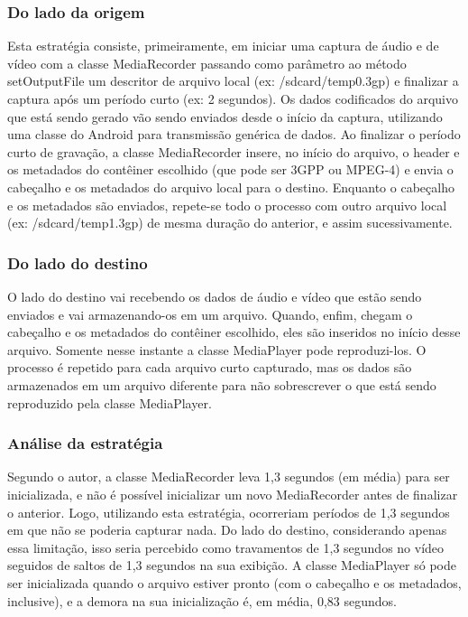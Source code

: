 \documentclass{acm_proc_article-sp}
\begin{document}
\subsubsection{Do lado da origem}

Esta estratégia consiste, primeiramente, em iniciar uma captura de áudio e de vídeo com a classe MediaRecorder passando como parâmetro ao método setOutputFile um descritor de arquivo local (ex: /sdcard/temp0.3gp) e finalizar a captura após um período curto (ex: 2 segundos). Os dados codificados do arquivo que está sendo gerado vão sendo enviados desde o início da captura, utilizando uma classe do Android para transmissão genérica de dados. Ao finalizar o período curto de gravação, a classe MediaRecorder insere, no início do arquivo, o header e os metadados do contêiner escolhido (que pode ser 3GPP ou MPEG-4) e envia o cabeçalho e os metadados do arquivo local para o destino. Enquanto o cabeçalho e os metadados são enviados, repete-se todo o processo com outro arquivo local (ex: /sdcard/temp1.3gp) de mesma duração do anterior, e assim sucessivamente.

\subsubsection{Do lado do destino}

O lado do destino vai recebendo os dados de áudio e vídeo que estão sendo enviados e vai armazenando-os em um arquivo. Quando, enfim, chegam o cabeçalho e os metadados do contêiner escolhido, eles são inseridos no início desse arquivo. Somente nesse instante a classe MediaPlayer pode reproduzi-los. O processo é repetido para cada arquivo curto capturado, mas os dados são armazenados em um arquivo diferente para não sobrescrever o que está sendo reproduzido pela classe MediaPlayer.

\subsubsection{Análise da estratégia}

Segundo o autor, a classe MediaRecorder leva 1,3 segundos (em média) para ser inicializada, e não é possível inicializar um novo MediaRecorder antes de finalizar o anterior. Logo, utilizando esta estratégia, ocorreriam períodos de 1,3 segundos em que não se poderia capturar nada. Do lado do destino, considerando apenas essa limitação, isso seria percebido como travamentos de 1,3 segundos no vídeo seguidos de saltos de 1,3 segundos na sua exibição. A classe MediaPlayer só pode ser inicializada quando o arquivo estiver pronto (com o cabeçalho e os metadados, inclusive), e a demora na sua inicialização é, em média, 0,83 segundos.
\end{document}
